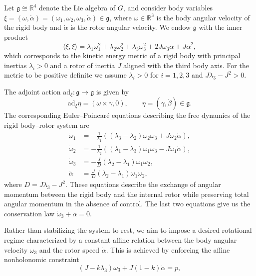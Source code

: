 \documentclass[letterpaper, 10 pt, conference]{ieeeconf}
\begin{document}
Let $\mathfrak{g} \cong \mathbb{R}^{4}$ denote the Lie algebra of $G$, and consider body variables $\xi = (\omega, \dot{\alpha}) = (\omega_1,\omega_2,\omega_3,\dot{\alpha}) \in \mathfrak{g}$, where $\omega \in \mathbb{R}^{3}$ is the body angular velocity of the rigid body and $\dot{\alpha}$ is the rotor angular velocity. We endow $\mathfrak{g}$ with the inner product
\[
\langle \xi, \xi \rangle
=
\lambda_{1} \omega_1^2 + \lambda_{2} \omega_2^2 + \lambda_{3} \omega_3^2
+ 2 J \omega_{3} \dot{\alpha}
+ J \dot{\alpha}^{2},
\]
which corresponds to the kinetic energy metric of a rigid body with principal inertias $\lambda_i>0$ and a rotor of inertia $J$ aligned with the third body axis. For the metric to be positive definite we assume $\lambda_i>0$ for $i=1,2,3$ and $J\lambda_{3}-J^{2}>0$.

The adjoint action $\mathrm{ad}_{\xi}:\mathfrak{g}\to\mathfrak{g}$ is given by
\[
\mathrm{ad}_{\xi}\eta = (\omega \times \gamma,0),
\qquad
\eta=(\gamma,\dot{\beta})\in\mathfrak{g}.
\]
The corresponding Euler--Poincar\'e equations describing the free dynamics of the rigid body--rotor system are
\begin{equation*}
\begin{split}
\dot{\omega}_{1} & = -\frac{1}{\lambda_{1}}
\left( (\lambda_{3}-\lambda_{2})\omega_{2}\omega_{3} + J \omega_{2}\dot{\alpha} \right), \\
\dot{\omega}_{2} & = -\frac{1}{\lambda_{2}}
\left( (\lambda_{1}-\lambda_{3})\omega_{1}\omega_{3} - J \omega_{1}\dot{\alpha} \right), \\
\dot{\omega}_{3} & = -\frac{J}{D} (\lambda_{2}-\lambda_{1})\omega_{1}\omega_{2}, \\
\ddot{\alpha} & = \frac{J}{D} (\lambda_{2}-\lambda_{1})\omega_{1}\omega_{2},
\end{split}
\end{equation*}
where $D = J\lambda_{3}-J^{2}$. These equations describe the exchange of angular momentum between the rigid body and the internal rotor while preserving total angular momentum in the absence of control. {The last two equations give us the conservation law $\dot{\omega}_{3}+\ddot{\alpha}=0$.}

Rather than stabilizing the system to rest, we aim to impose a desired rotational regime characterized by a constant affine relation between the body angular velocity $\omega_{3}$ and the rotor speed $\dot{\alpha}$. This is achieved by enforcing the affine nonholonomic constraint
\begin{equation}\label{constraint:rotor}
    (J - k \lambda_{3}) \omega_{3} + J(1-k)\dot{\alpha} = p,
\end{equation}
\end{document}
